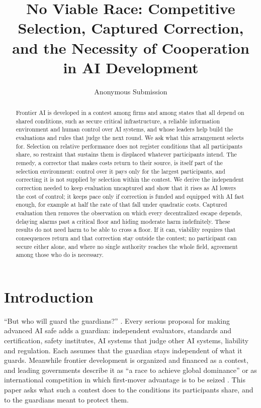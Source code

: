 \documentclass[letterpaper]{article} %
\title{No Viable Race: Competitive Selection, Captured Correction,\\ and the Necessity of Cooperation in AI Development}
\author{Anonymous Submission}
\theoremstyle{definition}
\begin{document}
\maketitle

\begin{abstract}
Frontier AI is developed in a contest among firms and among states that all depend on shared conditions, such as secure critical infrastructure, a reliable information environment and human control over AI systems, and whose leaders help build the evaluations and rules that judge the next round. We ask what this arrangement selects for. Selection on relative performance does not register conditions that all participants share, so restraint that sustains them is displaced whatever participants intend. The remedy, a corrector that makes costs return to their source, is itself part of the selection environment: control over it pays only for the largest participants, and correcting it is not supplied by selection within the contest. We derive the independent correction needed to keep evaluation uncaptured and show that it rises as AI lowers the cost of control; it keeps pace only if correction is funded and equipped with AI fast enough, for example at half the rate of that fall under quadratic costs. Captured evaluation then removes the observation on which every decentralized escape depends, delaying alarms past a critical floor and hiding moderate harm indefinitely. These results do not need harm to be able to cross a floor. If it can, viability requires that consequences return and that correction stay outside the contest; no participant can secure either alone, and where no single authority reaches the whole field, agreement among those who do is necessary.
\end{abstract}

\section{Introduction}

``But who will guard the guardians?'' \citep{hurwicz2008}. Every serious proposal for making advanced AI safe adds a guardian: independent evaluators, standards and certification, safety institutes, AI systems that judge other AI systems, liability and regulation. Each assumes that the guardian stays independent of what it guards. Meanwhile frontier development is organized and financed as a contest, and leading governments describe it as ``a race to achieve global dominance'' \citep{whitehouse2025} or as international competition in which first-mover advantage is to be seized \citep{statecouncil2017}. This paper asks what such a contest does to the conditions its participants share, and to the guardians meant to protect them.
\end{document}
